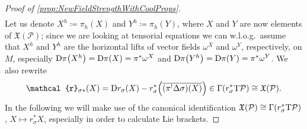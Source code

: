 \documentclass[reqno,a4paper,oneside]{amsart}
\theoremstyle{plain}
\theoremstyle{remark}
\theoremstyle{definition}
\def\bas#1\eas{\begin{align*}#1\end{align*}}
\begin{document}
\begin{proof}[Proof of \ref{prop:NewFieldStrengthWithCoolProps}]
\begin{align*}
\end{align*}
Let us denote $X^h \coloneqq \pi_h(X)$ and $Y^h \coloneqq \pi_h(Y)$, where $X$ and $Y$ are now elements of $\mathfrak{X}(\mathcal{P})$; since we are looking at tensorial equations we can w.l.o.g.\ assume that $X^h$ and $Y^h$ are the horizontal lifts of vector fields $\omega^X$ and $\omega^Y$, respectively, on $M$, especially $\mathrm{D}\pi\mleft( X^h \mright) = \mathrm{D}\pi\mleft( X \mright) = \pi^*\omega^X$ and $\mathrm{D}\pi\mleft( Y^h \mright) = \mathrm{D}\pi\mleft( Y \mright) = \pi^*\omega^Y$.
We also rewrite
\begin{equation*}
\mathcal{r}_{\sigma*}(X)
=
\mathrm{D}r_{\sigma}(X)
	- r_{\sigma}^*\mleft({\overline{ \mleft(\pi^! \Delta \sigma \mright) (X)}}\mright)
\in
\Gamma\mleft( r_\sigma^* \mathrm{T}\mathcal{P} \mright) \cong \mathfrak{X}(\mathcal{P}).
\end{equation*}
In the following we will make use of the canonical identification $\mathfrak{X}(\mathcal{P}) \cong \Gamma\mleft( r_\sigma^* \mathrm{T}\mathcal{P} \mright)$, $X \mapsto r_\sigma^*X$, especially in order to calculate Lie brackets.
%


\end{proof}
\end{document}
